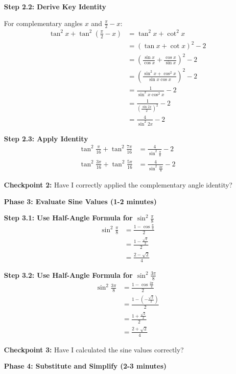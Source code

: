 \documentclass[12pt]{article}
\begin{document}
\begin{solutionbox}
\textbf{Step 2.2: Derive Key Identity}

For complementary angles $x$ and $\frac{\pi}{2}-x$:
\begin{align*}
\tan^2 x + \tan^2\left(\frac{\pi}{2}-x\right) &= \tan^2 x + \cot^2 x \\
&= \left(\tan x + \cot x\right)^2 - 2 \\
&= \left(\frac{\sin x}{\cos x} + \frac{\cos x}{\sin x}\right)^2 - 2 \\
&= \left(\frac{\sin^2 x + \cos^2 x}{\sin x \cos x}\right)^2 - 2 \\
&= \frac{1}{\sin^2 x \cos^2 x} - 2 \\
&= \frac{1}{\left(\frac{\sin 2x}{2}\right)^2} - 2 \\
&= \frac{4}{\sin^2 2x} - 2
\end{align*}

\textbf{Step 2.3: Apply Identity}
\begin{align*}
\tan^2\frac{\pi}{16}+\tan^2 \frac{7\pi}{16} &= \frac{4}{\sin^2 \frac{\pi}{8}} - 2 \\
\tan^2\frac{3\pi}{16}+\tan^2 \frac{5\pi}{16} &= \frac{4}{\sin^2 \frac{3\pi}{8}} - 2
\end{align*}

\textbf{Checkpoint 2:} Have I correctly applied the complementary angle identity?

\textbf{Phase 3: Evaluate Sine Values (1-2 minutes)}

\textbf{Step 3.1: Use Half-Angle Formula for $\sin^2\frac{\pi}{8}$}
\begin{align*}
\sin^2\frac{\pi}{8} &= \frac{1-\cos\frac{\pi}{4}}{2} \\
&= \frac{1-\frac{\sqrt{2}}{2}}{2} \\
&= \frac{2-\sqrt{2}}{4}
\end{align*}

\textbf{Step 3.2: Use Half-Angle Formula for $\sin^2\frac{3\pi}{8}$}
\begin{align*}
\sin^2\frac{3\pi}{8} &= \frac{1-\cos\frac{3\pi}{4}}{2} \\
&= \frac{1-\left(-\frac{\sqrt{2}}{2}\right)}{2} \\
&= \frac{1+\frac{\sqrt{2}}{2}}{2} \\
&= \frac{2+\sqrt{2}}{4}
\end{align*}

\textbf{Checkpoint 3:} Have I calculated the sine values correctly?

\textbf{Phase 4: Substitute and Simplify (2-3 minutes)}


\end{solutionbox}
\end{document}
